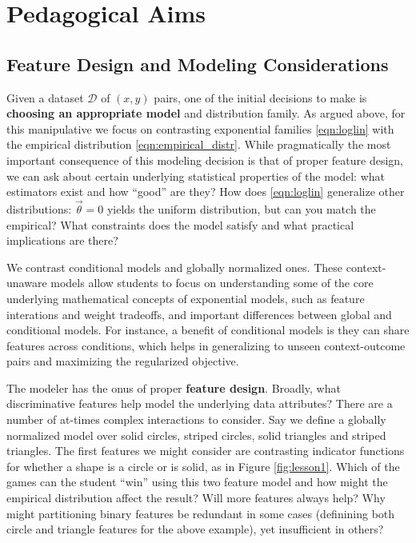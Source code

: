 \documentclass[11pt,letterpaper]{article}
\newcommand{\Data}[0]{\ensuremath{\mathcal{D}}}
\begin{document}
\section{Pedagogical Aims}\label{sec:aims}

\subsection{Feature Design and Modeling Considerations}

Given a dataset $\Data{}$ of $(x, y)$ pairs, one of the initial decisions 
to make is \textbf{choosing an appropriate model} and distribution family. 
As argued above, for this manipulative we focus on contrasting exponential families 
\eqref{eqn:loglin} with the empirical distribution \eqref{eqn:empirical_distr}. While pragmatically the most important 
consequence of this modeling decision is that of proper feature design, we can ask about 
certain underlying statistical properties of the model: what estimators 
exist and how ``good'' are they? How does \eqref{eqn:loglin} generalize other 
distributions: $\vec{\theta} = 0$ yields the uniform distribution, but can you match 
the empirical? What constraints does the model satisfy and what practical implications
are there?
 
We contrast conditional models and globally normalized ones. 
These context-unaware models allow students to focus on
understanding some of the core underlying mathematical concepts of
exponential models, such as feature interations and weight tradeoffs,
and important differences between global and conditional models. 
For instance, a benefit of conditional models is they can share 
features across conditions, which helps in generalizing to unseen context-outcome 
pairs and maximizing the regularized objective.

The modeler has the onus of proper \textbf{feature design}. Broadly, what discriminative features 
help model the underlying data attributes? There are a number of at-times complex interactions 
to consider. Say we define a globally 
normalized model over solid circles, striped circles, solid triangles and striped triangles. 
The first features we might consider are contrasting indicator functions for whether a shape
is a circle or is solid, as in Figure \ref{fig:lesson1}. Which of the games can the student 
``win'' using this two feature model and how might the empirical distribution affect the result? 
Will more features always help? Why might partitioning binary 
features be redundant in some cases (definining both circle and triangle features for the above example), 
yet insufficient in others?
\end{document}

